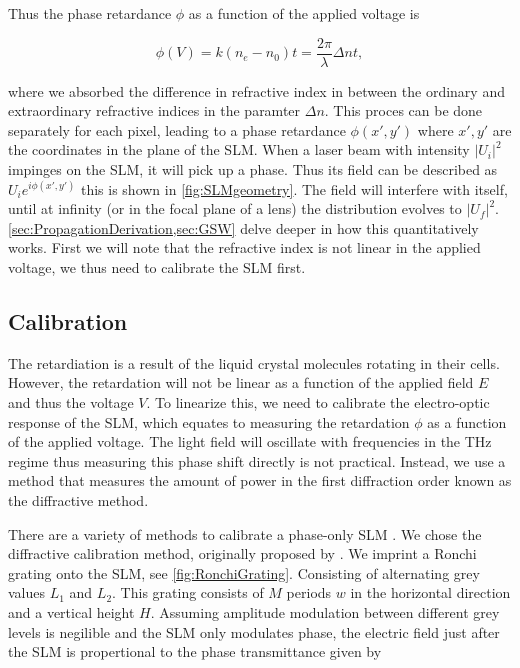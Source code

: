 Thus the phase retardance $\phi$ as a function of the applied voltage is \cite{Guzman2017}

\begin{equation}
    \phi(V) = k (n_e - n_0) t = \frac{2\pi}{\lambda} \Delta n t,
\end{equation}

where we absorbed the difference in refractive index in between the ordinary and extraordinary refractive indices in the paramter $\Delta n$.
This proces can be done separately for each pixel, leading to a phase retardance $
\phi(x',y')$ where $x',y'$ are the coordinates in the plane of the SLM. When a laser beam with intensity $|U_i|^2$ impinges on the SLM, it will pick up a phase. Thus its field can be described as $U_i e^{i\phi(x',y')}$ this is shown in \cref{fig:SLMgeometry}. The field will interfere with itself, until at infinity (or in the focal plane of a lens) the distribution evolves to $|U_f|^2$. \cref{sec:PropagationDerivation,sec:GSW} delve deeper in how this quantitatively works. First we will note that the refractive index is not linear in the applied voltage, we thus need to calibrate the SLM first. 

\subsection{Calibration}

The retardiation is a result of the liquid crystal molecules rotating in their cells. However, the retardation will not be linear as a function of the applied field $E$ and thus the voltage $V$. To linearize this, we need to calibrate the electro-optic response of the \ac{SLM}, which equates to measuring the retardation $\phi$ as a function of the applied voltage. The light field will oscillate with frequencies in the THz regime thus measuring this phase shift directly is not practical. Instead, we use a method that measures the amount of power in the first diffraction order known as the diffractive method. 

There are a variety of methods to calibrate a phase-only \ac{SLM} \cite{Li2019}. We chose the diffractive calibration method, originally proposed by \cite{Zhang1994}. We imprint a Ronchi grating onto the SLM, see \cref{fig:RonchiGrating}. Consisting of alternating grey values $L_1$ and $L_2$. This grating consists of $M$ periods $w$ in the horizontal direction and a vertical height $H$. Assuming amplitude modulation between different grey levels is negilible and the SLM only modulates phase, the electric field just after the SLM is propertional to the phase transmittance given by

